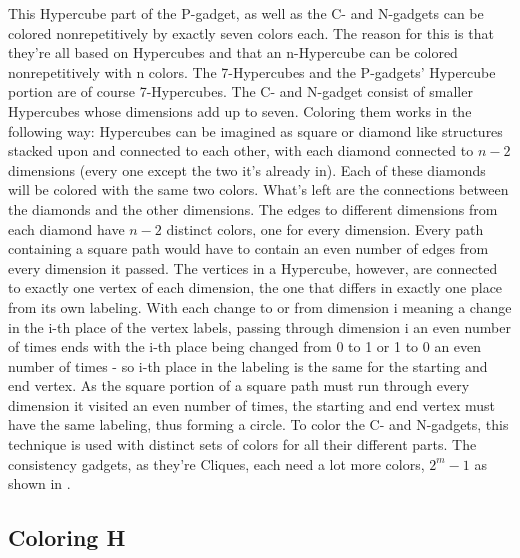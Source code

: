 \documentclass[12pt,a4paper]{article}
\begin{document}
This Hypercube part of the P-gadget, as well as the C- and N-gadgets can be colored nonrepetitively by exactly seven colors each. The reason for this is that they're all based on Hypercubes and that an n-Hypercube can be colored nonrepetitively with n colors. The 7-Hypercubes and the P-gadgets' Hypercube portion are of course 7-Hypercubes. The C- and N-gadget consist of smaller Hypercubes whose dimensions add up to seven. Coloring them works in the following way: Hypercubes can be imagined as square or diamond like structures stacked upon and connected to each other, with each diamond connected to $n-2$ dimensions (every one except the two it's already in). Each of these diamonds will be colored with the same two colors. What's left are the connections between the diamonds and the other dimensions. The edges to different dimensions from each diamond have $n-2$ distinct colors, one for every dimension. Every path containing a square path would have to contain an even number of edges from every dimension it passed. The vertices in a Hypercube, however, are connected to exactly one vertex of each dimension, the one that differs in exactly one place from its own labeling. With each change to or from dimension i meaning a change in the i-th place of the vertex labels, passing through dimension i an even number of times ends with the i-th place being changed from 0 to 1 or 1 to 0 an even number of times - so i-th place in the labeling is the same for the starting and end vertex. As the square portion of a square path must run through every dimension it visited an even number of times, the starting and end vertex must have the same labeling, thus forming a circle. 
\newline
To color the C- and N-gadgets, this technique is used with distinct sets of colors for all their different parts. The consistency gadgets, as they're Cliques, each need a lot more colors, $2^m-1$ as shown in \citep{Alon2002}.

\subsection{Coloring H}
\end{document}
